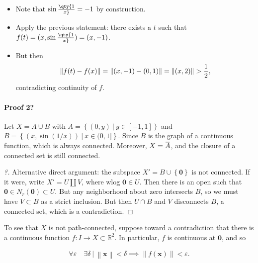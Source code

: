 \begin{solution}
\begin{itemize}
\begin{itemize}
    \begin{itemize}
    \tightlist
    \item
      Note that \(\sin\qty{1\over x} = -1\) by construction.
    \item
      Apply the previous statement: there exists a \(t\) such that
      \(f(t) = (x, \sin\qty{1\over x}) = (x, -1)\).
    \item
      But then
      \begin{align*}
      {\left\lVert {f(t) - f(x)} \right\rVert} = {\left\lVert {(x, -1) - (0, 1)} \right\rVert} = {\left\lVert {(x, 2)} \right\rVert} > {1\over 2}
      ,\end{align*}
      contradicting continuity of \(f\).
    \end{itemize}
  \end{itemize}
\end{itemize}

\hypertarget{proof-2-3}{%
\paragraph{Proof 2?}\label{proof-2-3}}

Let \(X = A \cup B\) with
\(A = \left\{{(0, y) {~\mathrel{\Big|}~}y\in [-1, 1] }\right\}\) and
\(B = \left\{{(x, \sin(1/x)) {~\mathrel{\Big|}~}x\in (0, 1]}\right\}\).
Since \(B\) is the graph of a continuous function, which is always
connected. Moreover,
\(X = \mkern 1.5mu\overline{\mkern-1.5muA\mkern-1.5mu}\mkern 1.5mu\),
and the closure of a connected set is still connected.

\begin{proof}[?]

Alternative direct argument: the subspace
\(X' = B \cup\left\{{\mathbf{0}}\right\}\) is not connected. If it were,
write \(X' = U {\coprod}V\), where wlog \(\mathbf{0} \in U\). Then there
is an open such that \(\mathbf{0} \in N_r(\mathbf{0}) \subset U\). But
any neighborhood about zero intersects \(B\), so we must have
\(V \subset B\) as a strict inclusion. But then \(U \cap B\) and \(V\)
disconnects \(B\), a connected set, which is a contradiction.

\end{proof}

To see that \(X\) is not path-connected, suppose toward a contradiction
that there is a continuous function
\(f: I \to X \subset {\mathbb{R}}^2\). In particular, \(f\) is
continuous at \(\mathbf{0}\), and so

\begin{align*} \forall \varepsilon \quad \exists \delta {~\mathrel{\Big|}~}{\left\lVert {\mathbf{x}} \right\rVert} < \delta \implies {\left\lVert {f(\mathbf{x})} \right\rVert} < \varepsilon .\end{align*}


\end{solution}
